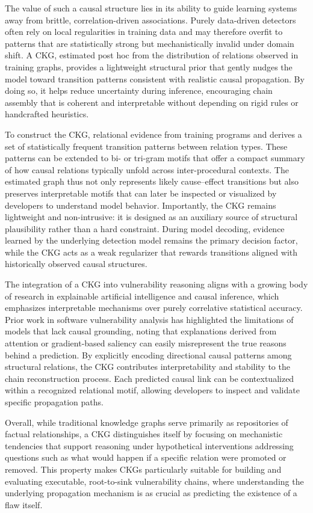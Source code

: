 \documentclass{buthesis}
\begin{document}
The value of such a causal structure lies in its ability to guide learning systems away from brittle, correlation-driven associations. Purely data-driven detectors often rely on local regularities in training data and may therefore overfit to patterns that are statistically strong but mechanistically invalid under domain shift. A CKG, estimated post hoc from the distribution of relations observed in training graphs, provides a lightweight structural prior that gently nudges the model toward transition patterns consistent with realistic causal propagation. By doing so, it helps reduce uncertainty during inference, encouraging chain assembly that is coherent and interpretable without depending on rigid rules or handcrafted heuristics.

To construct the CKG, relational evidence from training programs and derives a set of statistically frequent transition patterns between relation types. These patterns can be extended to bi- or tri-gram motifs that offer a compact summary of how causal relations typically unfold across inter-procedural contexts. The estimated graph thus not only represents likely cause–effect transitions but also preserves interpretable motifs that can later be inspected or visualized by developers to understand model behavior. Importantly, the CKG remains lightweight and non-intrusive: it is designed as an auxiliary source of structural plausibility rather than a hard constraint. During model decoding, evidence learned by the underlying detection model remains the primary decision factor, while the CKG acts as a weak regularizer that rewards transitions aligned with historically observed causal structures.

The integration of a CKG into vulnerability reasoning aligns with a growing body of research in explainable artificial intelligence and causal inference, which emphasizes interpretable mechanisms over purely correlative statistical accuracy. Prior work in software vulnerability analysis has highlighted the limitations of models that lack causal grounding, noting that explanations derived from attention or gradient-based saliency can easily misrepresent the true reasons behind a prediction. By explicitly encoding directional causal patterns among structural relations, the CKG contributes interpretability and stability to the chain reconstruction process. Each predicted causal link can be contextualized within a recognized relational motif, allowing developers to inspect and validate specific propagation paths.

Overall, while traditional knowledge graphs serve primarily as repositories of factual relationships, a CKG distinguishes itself by focusing on mechanistic tendencies that support reasoning under hypothetical interventions addressing questions such as what would happen if a specific relation were promoted or removed. This property makes CKGs particularly suitable for building and evaluating executable, root-to-sink vulnerability chains, where understanding the underlying propagation mechanism is as crucial as predicting the existence of a flaw itself.
\end{document}
